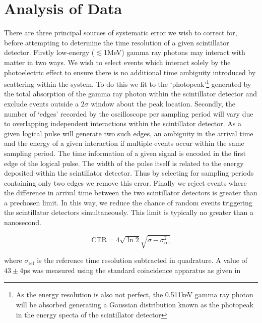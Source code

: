 \section{Analysis of Data}
There are three principal sources of systematic error we wish to correct for, before attempting to determine the time resolution of a given scintillator detector. Firstly low-energy ($\lesssim$1MeV) gamma ray photons may interact with matter in two ways. We wish to select events which interact solely by the photoelectric effect to ensure there is no additional time ambiguity introduced by scattering within the system. To do this we fit to the `photopeak'\footnote{As the energy resolution is also not perfect, the 0.511keV gamma ray photon will be absorbed generating a Gaussian distribution known as the photopeak in the energy specta of the scintillator detector} generated by the total absorption of the gamma ray photon within the scintillator detector and exclude events outside a $2\sigma$ window about the peak location. Secondly, the number of `edges' recorded by the oscilloscope per sampling period will vary due to overlapping independent interactions within the scintillator detector. As a given logical pulse will generate two such edges, an ambiguity in the arrival time and the energy of a given interaction if multiple events occur within the same sampling period. The time information of a given signal is encoded in the first edge of the logical pulse. The width of the pulse itself is related to the energy deposited within the scintillator detector. Thus by selecting for sampling periods containing only two edges we remove this error. Finally we reject events where the difference in arrival time between the two scintillator detectors is greater than a prechosen limit. In this way, we reduce the chance of random events triggering the scintillator detectors simultaneously. This limit is typically no greater than a nanosecond.


\begin{equation}
\textrm{CTR} = 4\sqrt{\ln{2}}\sqrt{\sigma-\sigma_\textrm{ref}^2}
\label{eqn:ctr-fromreference}
\end{equation}

where $\sigma_\text{ref}$ is the reference time resolution subtracted in quadrature. A value of $43\pm4$ps was measured using the standard coincidence apparatus as given in \cite{ch_Meyer_Pizzichemi_Lecoq_2013}


